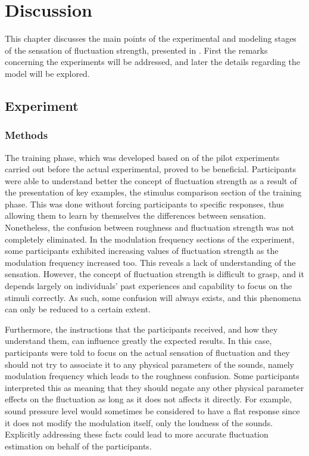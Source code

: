 \documentclass[../main.tex]{subfiles}
\begin{document}
\chapter{Discussion}
\label{cha:discussion}

This chapter discusses the main points of the experimental and modeling stages
of the sensation of fluctuation strength, presented in
. First the remarks concerning the experiments
will be addressed, and later the details regarding the model will be explored.

\section{Experiment}

\subsection{Methods}

The training phase, which was developed based on of the pilot experiments carried
out before the actual experimental, proved to be beneficial. Participants were
able to understand better the concept of fluctuation strength as a result of the
presentation of key examples, the stimulus comparison section of the training
phase. This was done without forcing participants to specific responses, thus
allowing them to learn by themselves the differences between sensation.
Nonetheless, the confusion between roughness and fluctuation strength was not
completely eliminated. In the modulation frequency sections of the experiment,
some participants exhibited increasing values of fluctuation strength as the
modulation frequency increased too. This reveals a lack of understanding of the
sensation. However, the concept of fluctuation strength is difficult to grasp,
and it depends largely on individuals' past experiences and capability to focus
on the stimuli correctly. As such, some confusion will always exists, and this
phenomena can only be reduced to a certain extent.

Furthermore, the instructions that the participants received, and how they
understand them, can influence greatly the expected results. In this case,
participants were told to focus on the actual sensation of fluctuation and they
should not try to associate it to any physical parameters of the sounds, namely
modulation frequency which leads to the roughness confusion. Some participants
interpreted this as meaning that they should negate any other physical parameter
effects on the fluctuation as long as it does not affects it directly. For
example, sound pressure level would sometimes be considered to have a flat
response since it does not modify the modulation itself, only the loudness of
the sounds. Explicitly addressing these facts could lead to more accurate
fluctuation estimation on behalf of the participants.
\end{document}
